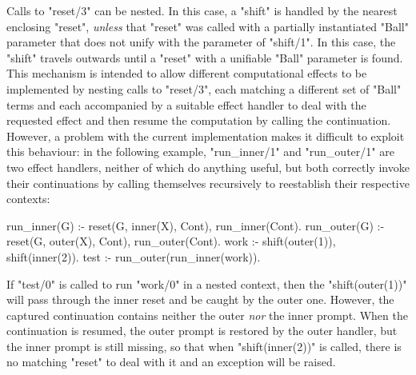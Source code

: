 Calls to "reset/3" can be nested.  In this case, a "shift" is handled by the nearest
enclosing "reset", \emph{unless} that "reset" was called with a partially instantiated "Ball" parameter
that does not unify with the parameter of "shift/1". In this case, the "shift" travels outwards
until a "reset" with a unifiable "Ball" parameter is found. This mechanism is intended to allow different
computational effects to be implemented by nesting calls to "reset/3", each matching a different set of
"Ball" terms and each accompanied by a suitable effect handler to deal with the requested effect and then 
resume the computation by calling the continuation.
However, a problem with the current implementation makes it difficult to exploit this behaviour:
in the following example, "run_inner/1" and "run_outer/1" are two effect handlers, neither of which do
anything useful, but both correctly invoke their continuations by calling themselves recursively
to reestablish their respective contexts:
\begin{prolog}
  run_inner(G) :- reset(G, inner(X), Cont), run_inner(Cont).
  run_outer(G) :- reset(G, outer(X), Cont), run_outer(Cont).
  work :- shift(outer(1)), shift(inner(2)).
  test :- run_outer(run_inner(work)).
\end{prolog}
If "test/0" is called to run "work/0" in a nested context, then the "shift(outer(1))"
will pass through the inner reset and be caught by the outer one. However, the captured
continuation contains neither the outer \emph{nor} the inner prompt. When the continuation is resumed,
the outer prompt is restored by the outer handler, but the inner prompt is still missing, so that
when "shift(inner(2))" is called, there is no matching "reset" to deal with it and an exception will be
raised.

